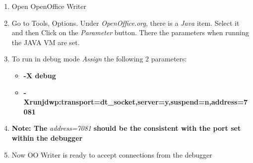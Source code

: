 \begin{enumerate}
  \item Open OpenOffice Writer
  \item Go to Tools, Options. Under \emph{OpenOffice.org}, there is a \emph{Java} item. Select it and then Click on the 
        \emph{Parameter} button. There the parameters when running the JAVA VM are set.
  \item To run in debug mode \emph{Assign} the following 2 parameters:
  \begin{itemize}
    \item \textbf{-X debug}
    \item \textbf{-Xrunjdwp:transport=dt\_socket,server=y,suspend=n,address=7081}
  \end{itemize}
  \item \textbf{Note: The} \emph{address=7081} \textbf{should be the consistent with the port set within the debugger}
  \item  Now OO Writer is ready to accept connections from the debugger
\end{enumerate} 
